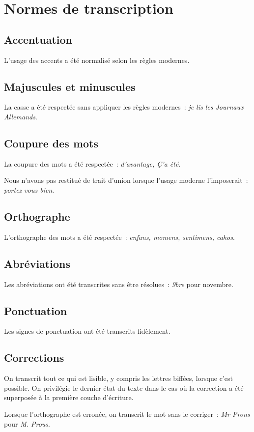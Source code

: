 \documentclass[a4paper,12pt,twoside]{book}
\begin{document}
	\renewcommand{\appendixtocname}{Annexes}
	
	\addappheadtotoc%
	
	\appendixpage %
	\chapter{Normes de transcription}
	
		\section{Accentuation}
		L'usage des accents a été normalisé selon les règles modernes.
		
		\section{Majuscules et minuscules}
		La casse a été respectée sans appliquer les règles modernes~: \textit{je lis les Journaux Allemands}.
		
		\section{Coupure des mots}
		La coupure des mots a été respectée~: \textit{d'avantage, Ç'a été}.
		
		Nous n'avons pas restitué de trait d'union lorsque l'usage moderne l'imposerait~: \textit{portez vous bien}.
				
		\section{Orthographe}
		L'orthographe des mots a été respectée~: \textit{enfans, momens, sentimens, cahos}.
		
		\section{Abréviations}
		Les abréviations ont été transcrites sans être résolues~: \textit{9bre} pour novembre.

		\section{Ponctuation}
		Les signes de ponctuation ont été transcrits fidèlement.
		
		\section{Corrections}
		On transcrit tout ce qui est lisible, y compris les lettres biffées, lorsque c'est possible. On privilégie le dernier état du texte dans le cas où la correction a été superposée à la première couche d'écriture.
		
		Lorsque l'orthographe est erronée, on transcrit le mot sans le corriger~: \textit{Mr Prons} pour \textit{M. Prous}.
           	
	\printbibheading[heading=bibintoc]%
	\printbibliography[heading=subbibliography, title=Scripts, keyword=scripts]
\end{document}
